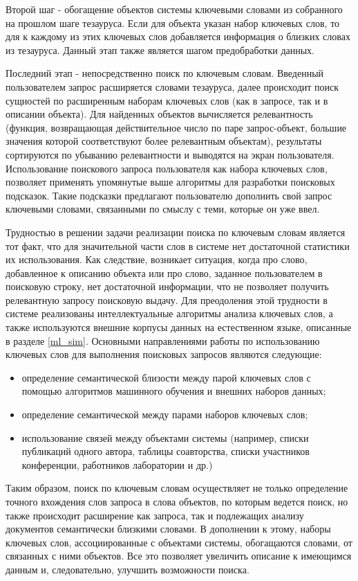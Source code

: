 Второй шаг - обогащение объектов системы ключевыми словами из собранного на прошлом шаге тезауруса. Если для объекта указан набор ключевых слов, то для к каждому из этих ключевых слов добавляется информация о близких словах из тезауруса. Данный этап также является шагом предобработки данных. 

Последний этап - непосредственно поиск по ключевым словам. Введенный пользователем запрос расширяется словами тезауруса, далее происходит поиск сущностей по расширенным наборам ключевых слов (как в запросе, так и в описании объекта). Для найденных объектов вычисляется релевантность (функция, возвращающая действительное число по паре запрос-объект, большие значения которой соответствуют более релевантным объектам), результаты сортируются по убыванию релевантности и выводятся на экран пользователя. Использование поискового запроса пользователя как набора ключевых слов, позволяет применять упомянутые выше алгоритмы для разработки поисковых подсказок. Такие подсказки предлагают пользователю дополнить свой запрос ключевыми словами, связанными по смыслу с теми, которые он уже ввел.

Трудностью в решении задачи реализации поиска по ключевым словам является тот факт, что для значительной части слов в системе нет достаточной статистики их использования. Как следствие, возникает ситуация, когда про слово, добавленное к описанию объекта или про слово, заданное пользователем в поисковую строку, нет достаточной информации, что не позволяет получить релевантную запросу поисковую выдачу. Для преодоления этой трудности в системе реализованы интеллектуальные алгоритмы анализа ключевых слов, а также используются внешние корпусы данных на естественном языке, описанные в разделе \ref{ml_sim}. Основными направлениями работы по использованию ключевых слов для выполнения поисковых запросов являются следующие:

\begin{itemize}
    \item определение семантической близости между парой ключевых слов с помощью алгоритмов машинного обучения и внешних наборов данных;
    \item определение семантической между парами наборов ключевых слов;
    \item использование связей между объектами системы (например, списки публикаций одного автора, таблицы соавторства, списки участников конференции, работников лаборатории и др.)
\end{itemize}

Таким образом, поиск по ключевым словам осуществляет не только определение точного вхождения слов запроса в слова объектов, по которым ведется поиск, но также происходит расширение как запроса, так и подлежащих анализу документов семантически близкими словами. В дополнении к этому, наборы ключевых слов, ассоциированные с объектами системы, обогащаются словами, от связанных с ними объектов. Все это позволяет увеличить описание к имеющимся данным и, следовательно, улучшить возможности поиска. 


